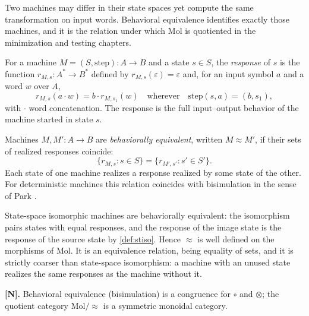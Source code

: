 Two machines may differ in their state spaces yet compute the same
transformation on input words. Behavioral equivalence identifies exactly
those machines, and it is the relation under which Mol is quotiented in the
minimization and testing chapters.

\begin{definition}[Response]\label{def:response}
For a machine $M = (S, \mathrm{step}) : A \to B$ and a state $s \in S$, the
\emph{response} of $s$ is the function $r_{M,s} : A^{*} \to B^{*}$ defined by
$r_{M,s} (\varepsilon) = \varepsilon$ and, for an input symbol $a$ and a word
$w$ over $A$,
\[ r_{M,s} (a \cdot w) = b \cdot r_{M,s_1} (w)
   \quad\text{wherever}\quad \mathrm{step} (s, a) = (b, s_1) , \]
with $\cdot$ word concatenation. The response is the full input--output
behavior of the machine started in state $s$.
\end{definition}

\begin{definition}\label{def:bisim}
Machines $M, M' : A \to B$ are \emph{behaviorally equivalent}, written
$M \approx M'$, if their sets of realized responses coincide:
\[ \{ r_{M,s} : s \in S \} = \{ r_{M',s'} : s' \in S' \} . \]
Each state of one machine realizes a response realized by some state of the
other. For deterministic machines this relation coincides with bisimulation
in the sense of Park \citep{park}.
\end{definition}

\begin{remark}
State-space isomorphic machines are behaviorally equivalent: the isomorphism
pairs states with equal responses, and the response of the image state is
the response of the source state by \autoref{def:stiso}. Hence $\approx$ is
well defined on the morphisms of Mol. It is an equivalence relation, being
equality of sets, and it is strictly coarser than state-space isomorphism: a
machine with an unused state realizes the same responses as the machine
without it.
\end{remark}

\begin{theorem}\label{thm:6}
\textbf{[N].} Behavioral equivalence (bisimulation) is a congruence for
$\circ$ and $\otimes$; the quotient category $\mathrm{Mol}/{\approx}$ is a
symmetric monoidal category.
\end{theorem}

